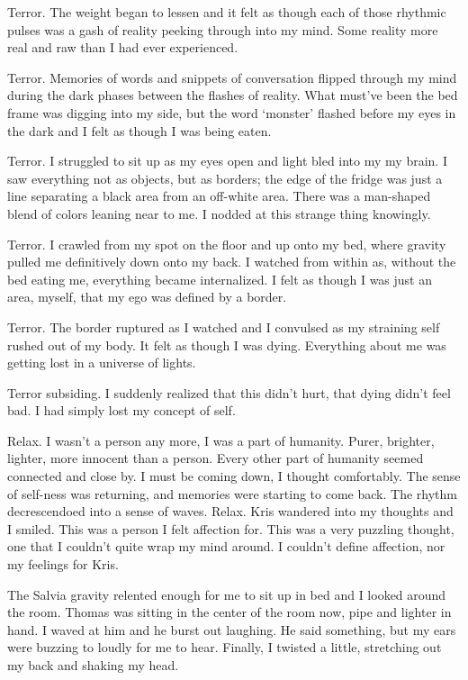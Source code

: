 Terror.  The weight began to lessen and it felt as though each of those rhythmic pulses was a gash of reality peeking through into my mind.  Some reality more real and raw than I had ever experienced.

Terror.  Memories of words and snippets of conversation flipped through my mind during the dark phases between the flashes of reality.  What must've been the bed frame was digging into my side, but the word `monster' flashed before my eyes in the dark and I felt as though I was being eaten.

Terror.  I struggled to sit up as my eyes open and light bled into my my brain.  I saw everything not as objects, but as borders; the edge of the fridge was just a line separating a black area from an off-white area.  There was a man-shaped blend of colors leaning near to me.  I nodded at this strange thing knowingly.

Terror.  I crawled from my spot on the floor and up onto my bed, where gravity pulled me definitively down onto my back.  I watched from within as, without the bed eating me, everything became internalized.  I felt as though I was just an area, myself, that my ego was defined by a border.

Terror.  The border ruptured as I watched and I convulsed as my straining self rushed out of my body.  It felt as though I was dying.  Everything about me was getting lost in a universe of lights.

Terror subsiding.  I suddenly realized that this didn't hurt, that dying didn't feel bad.  I had simply lost my concept of self.

Relax.  I wasn't a person any more, I was a part of humanity.  Purer, brighter, lighter, more innocent than a person.  Every other part of humanity seemed connected and close by.  I must be coming down, I thought comfortably.  The sense of self-ness was returning, and memories were starting to come back.  The rhythm decrescendoed into a sense of waves.  Relax.  Kris wandered into my thoughts and I smiled.  This was a person I felt affection for.  This was a very puzzling thought, one that I couldn't quite wrap my mind around.  I couldn't define affection, nor my feelings for Kris.

The Salvia gravity relented enough for me to sit up in bed and I looked around the room.  Thomas was sitting in the center of the room now, pipe and lighter in hand.  I waved at him and he burst out laughing.  He said something, but my ears were buzzing to loudly for me to hear.  Finally, I twisted a little, stretching out my back and shaking my head.

